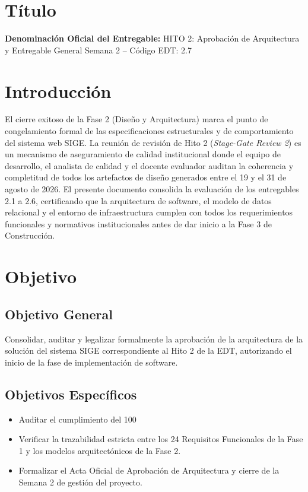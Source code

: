 \documentclass[12pt,a4paper]{article}
\begin{document}
\section{Título}
\textbf{Denominación Oficial del Entregable:} HITO 2: Aprobación de Arquitectura y Entregable General Semana 2 -- Código EDT: 2.7

\section{Introducción}
El cierre exitoso de la Fase 2 (Diseño y Arquitectura) marca el punto de congelamiento formal de las especificaciones estructurales y de comportamiento del sistema web SIGE. La reunión de revisión de Hito 2 (\textit{Stage-Gate Review 2}) es un mecanismo de aseguramiento de calidad institucional donde el equipo de desarrollo, el analista de calidad y el docente evaluador auditan la coherencia y completitud de todos los artefactos de diseño generados entre el 19 y el 31 de agosto de 2026. El presente documento consolida la evaluación de los entregables 2.1 a 2.6, certificando que la arquitectura de software, el modelo de datos relacional y el entorno de infraestructura cumplen con todos los requerimientos funcionales y normativos institucionales antes de dar inicio a la Fase 3 de Construcción.

\section{Objetivo}
\subsection{Objetivo General}
Consolidar, auditar y legalizar formalmente la aprobación de la arquitectura de la solución del sistema SIGE correspondiente al Hito 2 de la EDT, autorizando el inicio de la fase de implementación de software.
\subsection{Objetivos Específicos}
\begin{itemize}[leftmargin=1.5em, itemsep=2pt]
    \item Auditar el cumplimiento del 100%
    \item Verificar la trazabilidad estricta entre los 24 Requisitos Funcionales de la Fase 1 y los modelos arquitectónicos de la Fase 2.
    \item Formalizar el Acta Oficial de Aprobación de Arquitectura y cierre de la Semana 2 de gestión del proyecto.
\end{itemize}
\end{document}
